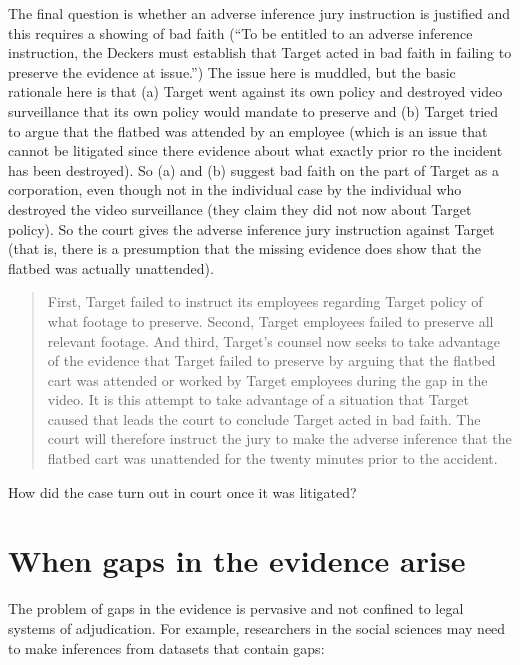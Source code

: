 \documentclass[
  10pt,
  dvipsnames,enabledeprecatedfontcommands]{scrartcl}
\begin{document}
The final question is whether an adverse inference jury instruction is
justified and this requires a showing of bad faith (``To be entitled to
an adverse inference instruction, the Deckers must establish that Target
acted in bad faith in failing to preserve the evidence at issue.'') The
issue here is muddled, but the basic rationale here is that (a) Target
went against its own policy and destroyed video surveillance that its
own policy would mandate to preserve and (b) Target tried to argue that
the flatbed was attended by an employee (which is an issue that cannot
be litigated since there evidence about what exactly prior ro the
incident has been destroyed). So (a) and (b) suggest bad faith on the
part of Target as a corporation, even though not in the individual case
by the individual who destroyed the video surveillance (they claim they
did not now about Target policy). So the court gives the adverse
inference jury instruction against Target (that is, there is a
presumption that the missing evidence does show that the flatbed was
actually unattended).

\begin{quote}
First, Target failed to instruct its employees regarding Target policy of what footage to preserve. Second, Target employees failed to preserve all relevant footage. And third, Target’s counsel now seeks to take advantage of the evidence that Target failed to preserve by arguing that the flatbed cart was attended or worked by Target employees during the gap in the video. It is this attempt to take advantage of a situation that Target caused that leads the court to conclude Target acted in bad faith. The court will therefore instruct the jury to make the adverse inference that the flatbed cart was unattended for the twenty minutes prior to the accident.
\end{quote}

How did the case turn out in court once it was litigated?

\hypertarget{when-gaps-in-the-evidence-arise}{%
\section{When gaps in the evidence
arise}\label{when-gaps-in-the-evidence-arise}}

The problem of gaps in the evidence is pervasive and not confined to
legal systems of adjudication. For example, researchers in the social
sciences may need to make inferences from datasets that contain gaps:
\end{document}
